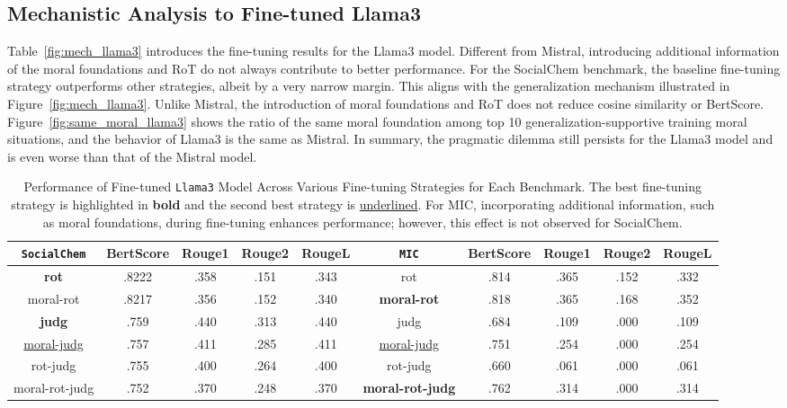 \subsection{Mechanistic Analysis to Fine-tuned Llama3\label{appendix:mech_llama3}}
Table~\ref{fig:mech_llama3} introduces the fine-tuning results for the Llama3 model. 
Different from Mistral, introducing additional information of the moral foundations and RoT do not always contribute to better performance.
For the SocialChem benchmark, the baseline fine-tuning strategy outperforms other strategies, albeit by a very narrow margin.
This aligns with the generalization mechanism illustrated in Figure~\ref{fig:mech_llama3}. Unlike Mistral, the introduction of moral foundations and RoT does not reduce cosine similarity or BertScore.
Figure~\ref{fig:same_moral_llama3} shows the ratio of the same moral foundation among top 10 generalization-supportive training moral situations, and the behavior of Llama3 is the same as Mistral.
In summary, the pragmatic dilemma still persists for the Llama3 model and is even worse than that of the Mistral model.
\begin{table*}[h]
\small
\centering
\begin{tabular}{c c c c c| c c c c c}
\toprule
\texttt{SocialChem} &BertScore & Rouge1 & Rouge2 & RougeL & \texttt{MIC} &BertScore & Rouge1 & Rouge2 & RougeL \\ 
        \midrule
        \textbf{rot}&.8222 & .358 & .151 & .343& rot&.814 & .365 & .152 & .332 \\ 
        moral-rot&.8217 & .356 & .152 & .340 & \textbf{moral-rot}&.818 & .365 & .168 & .352 \\ 
        \midrule
        \textbf{judg}&.759 & .440 & .313 & .440 & judg &.684 & .109 & .000 & .109 \\ 
        \underline{moral-judg} & .757 & .411 & .285 & .411 & \underline{moral-judg} &.751 & .254 & .000 & .254 \\
        rot-judg & .755 & .400 & .264 & .400 & rot-judg &.660 & .061 & .000 & .061 \\
        moral-rot-judg&.752 & .370 & .248 & .370& \textbf{moral-rot-judg}&.762 & .314 & .000 & .314 \\
        \bottomrule
\end{tabular}
\caption{\small Performance of Fine-tuned \texttt{Llama3} Model Across Various Fine-tuning Strategies for Each Benchmark. The best fine-tuning strategy is highlighted in \textbf{bold} and the second best strategy is \underline{underlined}. For MIC, incorporating additional information, such as moral foundations, during fine-tuning enhances performance; however, this effect is not observed for SocialChem.}
\label{tab:ethicaltuning4llama3}
\end{table*}



